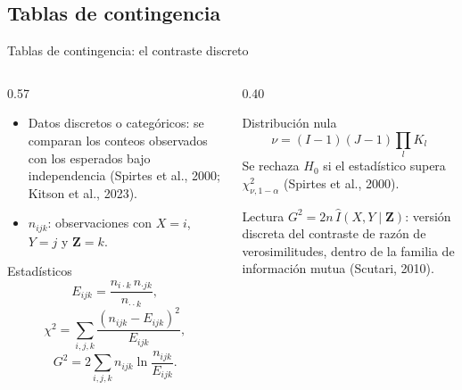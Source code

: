 \documentclass[aspectratio=169,11pt]{beamer}
\newcommand{\srccite}[1]{{\scriptsize\color{upmgray}(#1)}}
\begin{document}
\subsection{Tablas de contingencia}

\begin{frame}[t]{Tablas de contingencia: el contraste discreto}
  \small
  \begin{columns}[T,onlytextwidth]
    \begin{column}{0.57\textwidth}
      \begin{itemize}
        \item Datos discretos o categóricos: se comparan los conteos observados
              con los esperados bajo independencia
              \srccite{Spirtes et al., 2000; Kitson et al., 2023}.
        \item $n_{ijk}$: observaciones con $X=i$, $Y=j$ y $\mathbf Z=k$.
      \end{itemize}
      \begin{block}{Estadísticos}
        \[
          E_{ijk}=\frac{n_{i\cdot k}\,n_{\cdot jk}}{n_{\cdot\cdot k}},
        \]
        \[
          \chi^2=\sum_{i,j,k}\frac{(n_{ijk}-E_{ijk})^2}{E_{ijk}},
        \]
        \[
          G^2=2\sum_{i,j,k} n_{ijk}\ln\frac{n_{ijk}}{E_{ijk}}.
        \]
      \end{block}
    \end{column}
    \begin{column}{0.40\textwidth}
      \begin{block}{Distribución nula}
        \[
          \nu=(I-1)(J-1)\prod_l K_l
        \]
        Se rechaza $H_0$ si el estadístico supera
        $\chi^2_{\nu,1-\alpha}$ \srccite{Spirtes et al., 2000}.
      \end{block}
      \begin{exampleblock}{Lectura}
        $G^2=2n\,\hat I(X,Y\mid\mathbf Z)$: versión discreta del contraste de
        razón de verosimilitudes, dentro de la familia de información mutua
        \srccite{Scutari, 2010}.
      \end{exampleblock}
    \end{column}
  \end{columns}
\end{frame}
\end{document}
